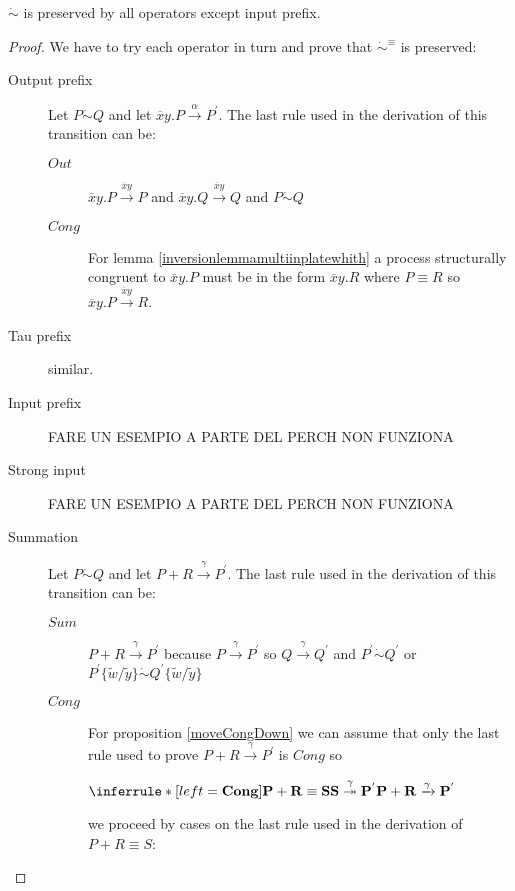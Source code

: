 \begin{proposition}
  $\dot{\sim}$ is preserved by all operators except input prefix.
  \begin{proof}
    We have to try each operator in turn and prove that $\dot{\sim}^{\equiv}$ is preserved:
    \begin{description}
      \item[Output prefix]
	Let $P \dot{\sim} Q$ and let $\overline{x}y.P \xrightarrow{\alpha} P^{'}$. The last rule used in the derivation of this transition can be:
	\begin{description}
	  \item[$Out$]
	    $\overline{x}y.P \xrightarrow{\overline{x}y} P$ and $\overline{x}y.Q \xrightarrow{\overline{x}y} Q$ and $P \dot{\sim} Q$
	  \item[$Cong$]
	    For lemma \ref{inversionlemmamultiinplatewhith} a process structurally congruent to $\overline{x}y.P$ must be in the form $\overline{x}y.R$ where $P \equiv R$ so $\overline{x}y.P \xrightarrow{\overline{x}y} R$.
	\end{description}
      \item[Tau prefix] similar.
      \item[Input prefix] FARE UN ESEMPIO A PARTE DEL PERCH NON FUNZIONA	
      \item[Strong input] FARE UN ESEMPIO A PARTE DEL PERCH NON FUNZIONA	
      \item[Summation]
	Let $P \dot{\sim} Q$ and let $P+R \xrightarrow{\gamma} P^{'}$. The last rule used in the derivation of this transition can be:
	\begin{description}
	  \item[$Sum$]
	    $P+R \xrightarrow{\gamma} P^{'}$ because $P \xrightarrow{\gamma} P^{'}$ so $Q \xrightarrow{\gamma} Q^{'}$ and $P^{'} \dot{\sim} Q^{'}$ or $P^{'}\{\tilde{w}/\tilde{y}\} \dot{\sim} Q^{'}\{\tilde{w}/\tilde{y}\}$
	  \item[$Cong$]
	    For proposition \ref{moveCongDown} we can assume that only the last rule used to prove $P+R \xrightarrow{\gamma} P^{'}$ is $Cong$ so
	    \begin{center}
	      $\inferrule* [left=\bf{Cong}]{
		  P+R\equiv S
		\\
		  S \stackrel{\gamma}{\twoheadrightarrow} P^{'}
	      }{
		P+R \xrightarrow{\gamma} P^{'}
	      }$
	    \end{center}
	    we proceed by cases on the last rule used in the derivation of $P+R\equiv S$:
	    \begin{description}

\end{description}
\end{description}
\end{description}
\end{proof}
\end{proposition}
